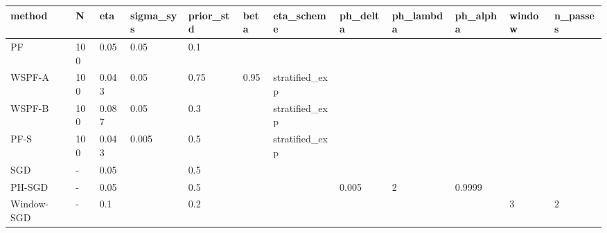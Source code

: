 \begin{tabular}{llllllllllll}
\hline
method & N & eta & sigma\_sys & prior\_std & beta & eta\_scheme & ph\_delta & ph\_lambda & ph\_alpha & window & n\_passes \\
\hline
PF & 100 & 0.05 & 0.05 & 0.1 &  &  &  &  &  &  &  \\
WSPF-A & 100 & 0.043 & 0.05 & 0.75 & 0.95 & stratified\_exp &  &  &  &  &  \\
WSPF-B & 100 & 0.087 & 0.05 & 0.3 &  & stratified\_exp &  &  &  &  &  \\
PF-S & 100 & 0.043 & 0.005 & 0.5 &  & stratified\_exp &  &  &  &  &  \\
SGD & - & 0.05 &  & 0.5 &  &  &  &  &  &  &  \\
PH-SGD & - & 0.05 &  & 0.5 &  &  & 0.005 & 2 & 0.9999 &  &  \\
Window-SGD & - & 0.1 &  & 0.2 &  &  &  &  &  & 3 & 2 \\
\hline
\end{tabular}

